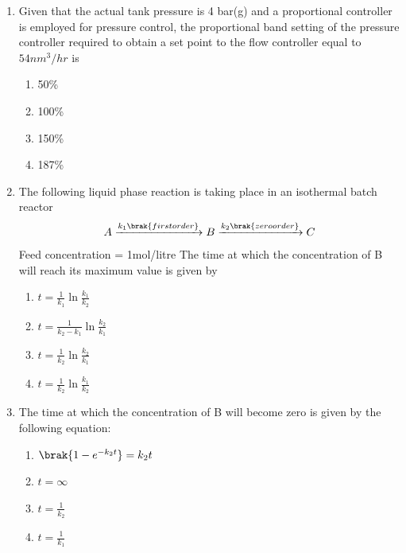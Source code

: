 \documentclass[journal,12pt,onecolumn]{IEEEtran}
\theoremstyle{remark}
\begin{document}
\begin{enumerate}
    \item Given that the actual tank pressure is 4 bar(g) and a proportional controller is employed for pressure control, the proportional band setting of the pressure controller required to obtain a set point to the flow controller equal to$ 54 nm^3/hr$ is

\begin{multicols}{4}
    \begin{enumerate}
        \item 50\%
        \item 100\%
        \item 150\%
        \item 187\%
    \end{enumerate}
\end{multicols}

    \item The following liquid phase reaction is taking place in an isothermal batch reactor
    \begin{align*}
        A\xrightarrow{k_1\brak{first order}}B\xrightarrow{k_2\brak{zero order}}C
    \end{align*}
    Feed concentration = 1mol/litre
    The time at which the concentration of B will reach its maximum value is given by 

    \begin{enumerate}
        \item $t=\frac{1}{k_1}\ln{\frac{k_1}{k_2}}$
           \item $t=\frac{1}{k_2-k_1}\ln{\frac{k_2}{k_1}}$
              \item $t=\frac{1}{k_2}\ln{\frac{k_2}{k_1}}$
                 \item $t=\frac{1}{k_2}\ln{\frac{k_1}{k_2}}$
    \end{enumerate}

    \item The time at which the concentration of B will become zero is given by the following equation:

    \begin{multicols}{2}
        \begin{enumerate}
            \item $\brak{1-e^{-k_2t}}=k_2t$
            \item $t= \infty$
            \item $t=\frac{1}{k_2}$
            \item $t=\frac{1}{k_1}$
        \end{enumerate}
    \end{multicols}


\end{enumerate}
\end{document}
